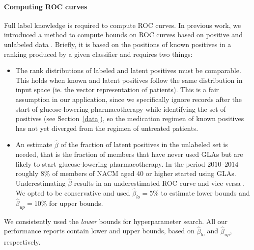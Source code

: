 \documentclass[twoside,11pt]{article}
\begin{document}
\paragraph{Computing ROC curves} Full label knowledge is required to compute ROC curves. In previous work, we introduced a method to compute bounds on ROC curves based on positive and unlabeled data \citep{claesen2015icml}. Briefly, it is based on the positions of known positives in a ranking produced by a given classifier and requires two things:
\begin{itemize}
\item The rank distributions of labeled and latent positives must be comparable. This holds when known and latent positives follow the same distribution in input space (ie. the vector representation of patients). This is a fair assumption in our application, since we specifically ignore records after the start of glucose-lowering pharmacotherapy while identifying the set of positives (see Section~\ref{data}), so the medication regimen of known positives has not yet diverged from the regimen of untreated patients.
\item An estimate $\hat{\beta}$ of the fraction of latent positives in the unlabeled set is needed, that is the fraction of members that have never used GLAs but are likely to start glucose-lowering pharmacotherapy. In the period $2010$--$2014$ roughly $8\%$ of members of NACM aged 40 or higher started using GLAs. Underestimating $\hat{\beta}$ results in an underestimated ROC curve and vice versa  \citep{claesen2015icml}. We opted to be conservative and used $\hat{\beta}_{lo} = 5\%$ to estimate lower bounds and $\hat{\beta}_{up}=10\%$ for upper bounds.
\end{itemize} 
We consistently used the \emph{lower} bounds for hyperparameter search. All our performance reports contain lower and upper bounds, based on $\hat{\beta}_{lo}$ and $\hat{\beta}_{up}$, respectively.
\end{document}
